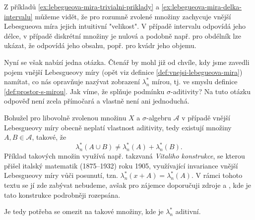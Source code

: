 Z příkladů \ref{ex:lebegueova-mira-trivialni-priklady} a \ref{ex:lebegueova-mira-delka-intervalu} můžeme vidět, že pro rozumně zvolené množiny zachycuje vnější Lebesgueova míra jejich intuitivní "velikost". V případě intervalu odpovídá jeho délce, v případě diskrétní množiny je nulová a podobně např. pro obdélník lze ukázat, že odpovídá jeho obsahu, popř. pro kvádr jeho objemu.

Nyní se však nabízí jedna otázka. Čtenář by mohl již od chvíle, kdy jsme zavedli pojem vnější Lebesgueovy míry (opět viz definice \ref{def:vnejsi-lebegueova-mira}) namítat, co nás opravňuje nazývat zobrazení $\lambda_n^*$ mírou, tj. ve smyslu definice \ref{def:prostor-s-mirou}. Jak víme, že splňuje podmínku $\sigma$-aditivity? Na tuto otázku odpověď není zcela přímočará a vlastně není ani jednoduchá.

Bohužel pro libovolně zvolenou množinu $X$ a $\sigma$-algebru $\mathcal{A}$ v případě vnější Lebesgueovy míry obecně neplatí vlastnost aditivity, tedy existují množiny $A,B\in\mathcal{A}$, takové, že
\[\lambda_n^*(A\cup B)\neq\lambda_n^*(A)+\lambda_n^*(B).\]
Příklad takových množin využívá např. takzvaná \emph{Vitaliho konstrukce}, se kterou přišel italský matematik  (1875--1932) roku 1905, využívající invariance vnější Lebesgueovy míry vůči posunutí, tzn. $\lambda_n^*(x+A)=\lambda_n^*(A)$. \cite{OConnor2025} V rámci tohoto textu se jí zde zabývat nebudeme, avšak pro zájemce doporučuji zdroje \citep[str. 3]{Lukes2013} a \cite{Verner2025}, kde je tato konstrukce podrobněji rozepsána.

Je tedy potřeba se omezit na takové množiny, kde je $\lambda_n^*$ aditivní.
    
